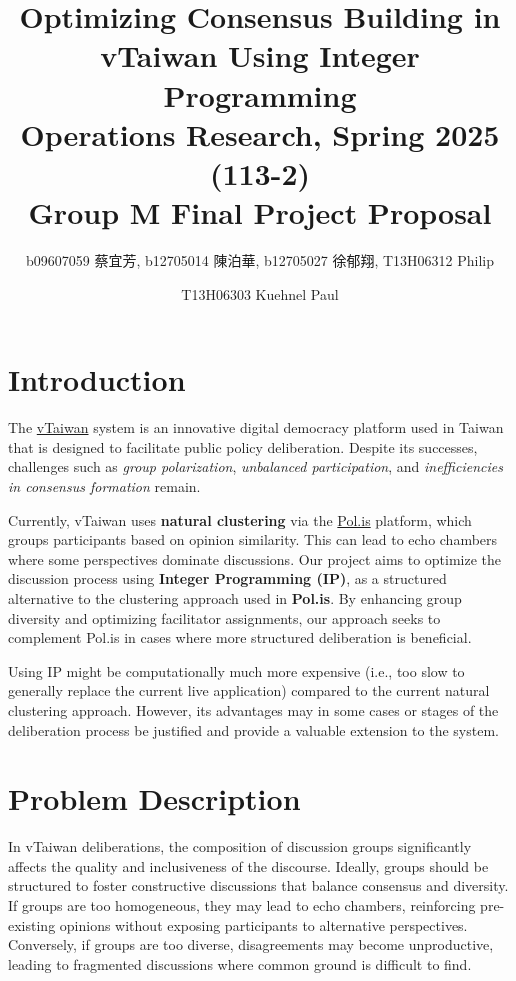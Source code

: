 \documentclass[11pt,a4paper]{article}
\title{Optimizing Consensus Building in vTaiwan Using Integer Programming \\ \large Operations Research, Spring 2025 (113-2) \\ Group M Final Project Proposal}
\author{b09607059 {\chinesefont 蔡宜芳}, b12705014 {\chinesefont 陳泊華}, b12705027 {\chinesefont 徐郁翔}, T13H06312 Philip}
\author{T13H06303 Kuehnel Paul}
\affil{Department of Information Management, National Taiwan University}
\begin{document}
\maketitle

\section{Introduction}
\label{sec-intro}

The \href{https://vtaiwan.tw}{vTaiwan} system is an innovative digital democracy platform used in Taiwan that is designed to facilitate public policy deliberation. Despite its successes, challenges such as \textit{group polarization}, \textit{unbalanced participation}, and \textit{inefficiencies in consensus formation} remain.  

Currently, vTaiwan uses \textbf{natural clustering} via the \href{https://pol.is/home}{Pol.is} platform, which groups participants based on opinion similarity. This can lead to echo chambers where some perspectives dominate discussions. 
Our project aims to optimize the discussion process using \textbf{Integer Programming (IP)}, as a structured alternative to the clustering approach used in \textbf{Pol.is}. By enhancing group diversity and optimizing facilitator assignments, our approach seeks to complement Pol.is in cases where more structured deliberation is beneficial.

Using IP might be computationally much more expensive (i.e., too slow to generally replace the current live application) compared to the current natural clustering approach. However,  its advantages may in some cases or stages of the deliberation process be justified and provide a valuable extension to the system. 


\section{Problem Description}
\label{sec-problem}

In vTaiwan deliberations, the composition of discussion groups significantly affects the quality and inclusiveness of the discourse. Ideally, groups should be structured to foster constructive discussions that balance consensus and diversity. If groups are too homogeneous, they may lead to echo chambers, reinforcing pre-existing opinions without exposing participants to alternative perspectives. Conversely, if groups are too diverse, disagreements may become unproductive, leading to fragmented discussions where common ground is difficult to find.
\end{document}
